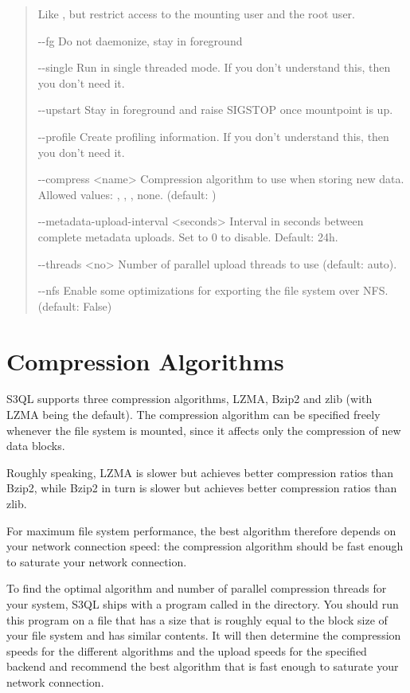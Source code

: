 \documentclass[letterpaper,10pt,english]{sphinxmanual}
\begin{document}
\begin{quote}
\begin{optionlist}{3cm}
Like , but restrict access to the
mounting user and the root user.
\item [-{-}fg]  
Do not daemonize, stay in foreground
\item [-{-}single]  
Run in single threaded mode. If you don't understand
this, then you don't need it.
\item [-{-}upstart]  
Stay in foreground and raise SIGSTOP once mountpoint
is up.
\item [-{-}profile]  
Create profiling information. If you don't understand
this, then you don't need it.
\item [-{-}compress \textless{}name\textgreater{}]  
Compression algorithm to use when storing new data.
Allowed values: , , , none.
(default: )
\item [-{-}metadata-upload-interval \textless{}seconds\textgreater{}]  
Interval in seconds between complete metadata uploads.
Set to 0 to disable. Default: 24h.
\item [-{-}threads \textless{}no\textgreater{}]  
Number of parallel upload threads to use (default:
auto).
\item [-{-}nfs]  
Enable some optimizations for exporting the file
system over NFS. (default: False)
\end{optionlist}
\end{quote}


\section{Compression Algorithms}
\label{mount:compression-algorithms}
S3QL supports three compression algorithms, LZMA, Bzip2 and zlib (with
LZMA being the default). The compression algorithm can be specified
freely whenever the file system is mounted, since it affects only the
compression of new data blocks.

Roughly speaking, LZMA is slower but achieves better compression
ratios than Bzip2, while Bzip2 in turn is slower but achieves better
compression ratios than zlib.

For maximum file system performance, the best algorithm therefore
depends on your network connection speed: the compression algorithm
should be fast enough to saturate your network connection.

To find the optimal algorithm and number of parallel compression
threads for your system, S3QL ships with a program called
 in the  directory. You should run this program
on a file that has a size that is roughly equal to the block size of
your file system and has similar contents. It will then determine the
compression speeds for the different algorithms and the upload speeds
for the specified backend and recommend the best algorithm that is
fast enough to saturate your network connection.
\end{document}
